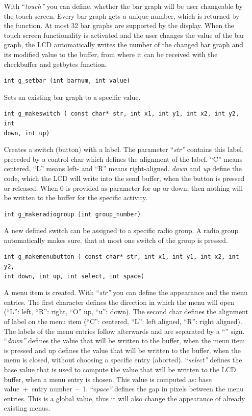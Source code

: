 With ``\emph{touch''} you can define, whether the bar graph will be user
changeable by the touch screen. Every bar graph gets a unique number,
which is returned by the function. At most 32 bar graphs are supported
by the display. When the touch screen functionality is activated and the
user changes the value of the bar graph, the LCD automatically writes
the number of the changed bar graph and its modified value to the
buffer, from where it can be received with the checkbuffer and getbytes
function.
\begin{lstlisting}
int g_setbar (int barnum, int value)
\end{lstlisting}
Sets an existing bar graph to a specific value.
\begin{lstlisting}
int g_makeswitch ( const char* str, int x1, int y1, int x2, int y2, int
down, int up)	
\end{lstlisting}
Creates a switch (button) with a label. The parameter ``\emph{str''}
contains this label, preceded by a control char which defines the
alignment of the label. ``C'' means centered, ``L'' means left- and
``R'' means right-aligned. \emph{down} and \emph{up} define the code,
which the LCD will write into the send buffer, when the button is
pressed or released. When 0 is provided as parameter for up or down,
then nothing will be written to the buffer for the specific activity.
\begin{lstlisting}
int g_makeradiogroup (int group_number)
\end{lstlisting}
A new defined switch can be assigned to a specific radio group. A radio
group automatically makes sure, that at most one switch of the group is
pressed.
\begin{lstlisting}
int g_makemenubutton ( const char* str, int x1, int y1, int x2, int y2,
int down, int up, int select, int space)	
\end{lstlisting}
A menu item is created. With ``\emph{str''} you can define the
appearance and the menu entries. The first character defines the
direction in which the menu will open (``L'': left, ``R'': right, ``O''
up, ``u'': down). The second char defines the alignment of label on the
menu item (``C'': centered, ``L'': left aligned, ``R'': right aligned).
The labels of the menu entries follow afterwards and are separated by a
``\textbar'' sign. ``\emph{down''} defines the value that will be
written to the buffer, when the menu item is pressed and up defines the
value that will be written to the buffer, when the menu is closed,
without choosing a specific entry (aborted). ``\emph{select''} defines
the base value that is used to compute the value that will be written to
the LCD buffer, when a menu entry is chosen. This value is computed as:
base value~+~entry number~--~1. ``s\emph{pace''} defines the gap in
pixels between the menu entries. This is a global value, thus it will
also change the appearance of already existing menus.

